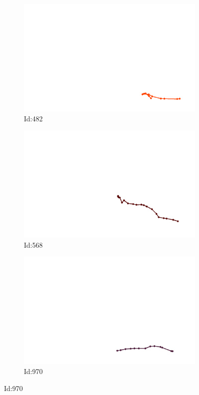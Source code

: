 \documentclass[12pt,twoside]{report}
\begin{document}
\begin{figure}
\centering
\begin{subfigure}[b]{0.20\textwidth}
\centering
\includegraphics[width=\textwidth]{../../trajectories/482.png}
\caption{Id:482}
\end{subfigure}
\begin{subfigure}[b]{0.20\textwidth}
\centering
\includegraphics[width=\textwidth]{../../trajectories/568.png}
\caption{Id:568}
\end{subfigure}
\begin{subfigure}[b]{0.20\textwidth}
\centering
\includegraphics[width=\textwidth]{../../trajectories/970.png}
\caption{Id:970}
\end{subfigure}
\end{figure}
\end{document}
